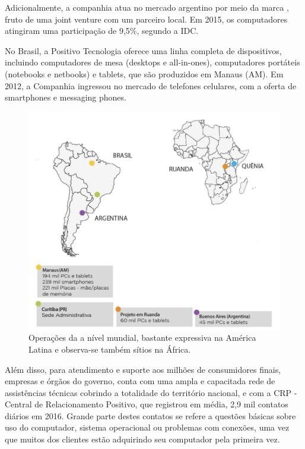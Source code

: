Adicionalmente, a companhia atua no mercado argentino por meio da marca \nomePositivoAr{}, fruto de uma joint venture com um parceiro local\cite{jointVentureBgh2010}. Em 2015, os computadores \nomePositivoAr{} atingiram uma participação de 9,5\%, segundo a IDC.

No Brasil, a Positivo Tecnologia oferece uma linha completa de dispositivos, incluindo computadores de mesa (desktops e all-in-ones), computadores portáteis (notebooks e netbooks) e tablets, que são produzidos em Manaus (AM). Em 2012, a Companhia ingressou no mercado de telefones celulares, com a oferta de smartphones e messaging phones.

\begin{figure}[h]
\begin{centering}
\includegraphics[width=1.0\textwidth]{Img/PositivoMundo}
\caption{Operações da \nomePositivo{} a nível mundial, bastante expressiva na América Latina e observa-se também sítios na África.}
\par\end{centering}
\end{figure}

Além disso, para atendimento e suporte aos milhões de consumidores finais, empresas e órgãos do governo, conta com uma ampla e capacitada rede de assistências técnicas cobrindo a totalidade do território nacional, e com a CRP - Central de Relacionamento Positivo, que registrou em média, 2,9 mil contatos diários em 2016. Grande parte destes contatos se refere a questões básicas sobre uso do computador, sistema operacional ou problemas com conexões, uma vez que muitos dos clientes estão adquirindo seu computador pela primeira vez.

